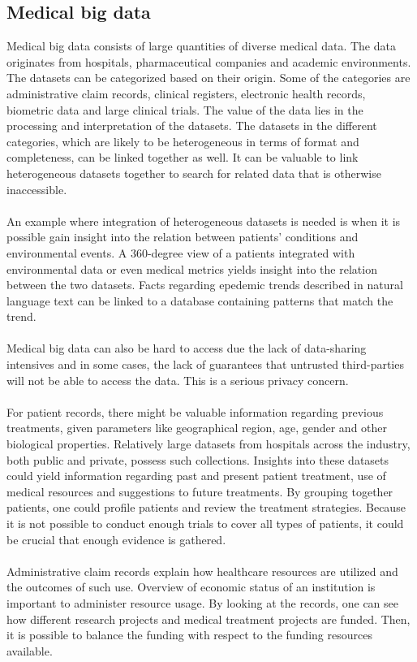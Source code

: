 \subsection{Medical big data}
Medical big data consists of large quantities of diverse medical data. The data originates from hospitals, pharmaceutical companies and academic environments. The datasets can be categorized based on their origin. Some of the categories are administrative claim records, clinical registers, electronic health records, biometric data and large clinical trials. The value of the data lies in the processing and interpretation of the datasets. The datasets in the different categories, which are likely to be heterogeneous in terms of format and completeness, can be linked together as well. It can be valuable to link heterogeneous datasets together to search for related data that is otherwise inaccessible.\cite{wp}
\\\\
An example where integration of heterogeneous datasets is needed is when it is possible gain insight into the relation between patients' conditions and environmental events. A 360-degree view of a patients integrated with environmental data or even medical metrics yields insight into the relation between the two datasets. Facts regarding epedemic trends described in natural language text can be linked to a database containing patterns that match the trend. \cite{integration}
\\\\
Medical big data can also be hard to access due the lack of data-sharing intensives and in some cases, the lack of guarantees that untrusted third-parties will not be able to access the data. This is a serious privacy concern. 
\\\\
For patient records, there might be valuable information regarding previous treatments, given parameters like geographical region, age, gender and other biological properties. Relatively large datasets from hospitals across the industry, both public and private, possess such collections. Insights into these datasets could yield information regarding past and present patient treatment, use of medical resources and suggestions to future treatments. By grouping together patients, one could profile patients and review the treatment strategies. Because it is not possible to conduct enough trials to cover all types of patients, it could be crucial that enough evidence is gathered. \cite{mbd3}
\\\\
Administrative claim records explain how healthcare resources are utilized and the outcomes of such use. Overview of economic status of an institution is important to administer resource usage. By looking at the records, one can see how different research projects and medical treatment projects are funded. Then, it is possible to balance the funding with respect to the funding resources available. 

